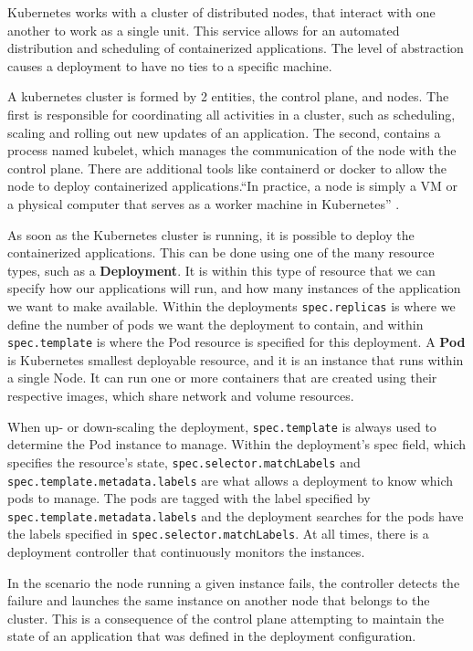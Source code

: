 Kubernetes works with a cluster of distributed nodes, that interact with one
another to work as a single unit. This service allows for an automated
distribution and scheduling of containerized applications. The level of
abstraction causes a deployment to have no ties to a specific machine.

A kubernetes cluster is formed by 2 entities, the control plane, and nodes. The
first is responsible for coordinating all activities in a cluster, such as
scheduling, scaling and rolling out new updates of an application. The second,
contains a process named kubelet, which manages the communication of the node
with the control plane. There are additional tools like containerd or docker to
allow the node to deploy containerized applications.``In practice, a node is
simply a VM or a physical computer that serves as a worker machine in
Kubernetes'' \cite{CreateKubeCluster}.

As soon as the Kubernetes cluster is running, it is possible to deploy the
containerized applications. This can be done using one of the many resource
types, such as a \textbf{Deployment}. It is within this type of resource that we can
specify how our applications will run, and how many instances of the application
we want to make available. Within the deployments \lstinline{spec.replicas} is
where we define the number of pods we want the deployment to contain, and within
\lstinline{spec.template} is where the Pod resource is specified for this
deployment. A \textbf{Pod} is Kubernetes smallest deployable resource, and it is an instance
that runs within a single Node. It can run one or more containers that are
created using their respective images, which share network and volume resources.

When up- or down-scaling the deployment, \lstinline{spec.template} is always
used to determine the Pod instance to manage.  Within the deployment's spec
field, which specifies the resource's state,
\lstinline{spec.selector.matchLabels} and
\lstinline{spec.template.metadata.labels} are what allows a deployment to know
which pods to manage. The pods are tagged with the label specified by
\lstinline{spec.template.metadata.labels} and the deployment searches for the
pods have the labels specified in \lstinline{spec.selector.matchLabels}. 
At all times, there is a deployment controller that continuously monitors the
instances. 

In the scenario the node running a given instance fails, the
controller detects the failure and launches the same instance on another node
that belongs to the cluster. This is a consequence of the control plane
attempting to maintain the state of an application that was defined in the
deployment configuration.

